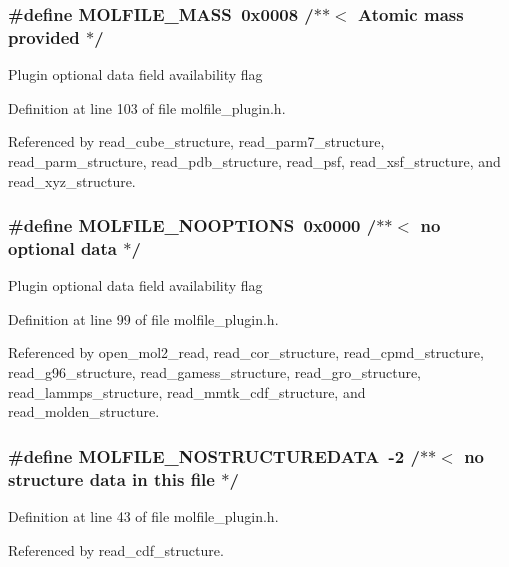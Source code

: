 \subsubsection{\setlength{\rightskip}{0pt plus 5cm}\#define MOLFILE\_\-MASS\ 0x0008 /$\ast$$\ast$$<$ Atomic mass provided             $\ast$/}\label{molfile__plugin_8h_a12}


Plugin optional data field availability flag 

Definition at line 103 of file molfile\_\-plugin.h.

Referenced by read\_\-cube\_\-structure, read\_\-parm7\_\-structure, read\_\-parm\_\-structure, read\_\-pdb\_\-structure, read\_\-psf, read\_\-xsf\_\-structure, and read\_\-xyz\_\-structure.
\subsubsection{\setlength{\rightskip}{0pt plus 5cm}\#define MOLFILE\_\-NOOPTIONS\ 0x0000 /$\ast$$\ast$$<$ no optional data                 $\ast$/}\label{molfile__plugin_8h_a8}


Plugin optional data field availability flag 

Definition at line 99 of file molfile\_\-plugin.h.

Referenced by open\_\-mol2\_\-read, read\_\-cor\_\-structure, read\_\-cpmd\_\-structure, read\_\-g96\_\-structure, read\_\-gamess\_\-structure, read\_\-gro\_\-structure, read\_\-lammps\_\-structure, read\_\-mmtk\_\-cdf\_\-structure, and read\_\-molden\_\-structure.
\subsubsection{\setlength{\rightskip}{0pt plus 5cm}\#define MOLFILE\_\-NOSTRUCTUREDATA\ -2   /$\ast$$\ast$$<$ no structure data in this file $\ast$/}\label{molfile__plugin_8h_a5}




Definition at line 43 of file molfile\_\-plugin.h.

Referenced by read\_\-cdf\_\-structure.
